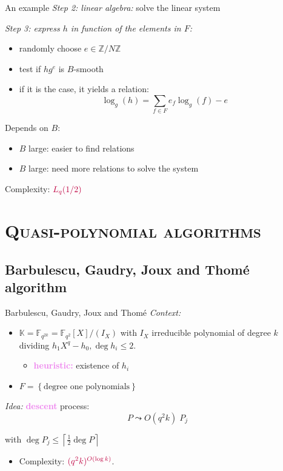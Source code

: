 \documentclass[xcolor=x11names,compress]{beamer}
\theoremstyle{break}
\theoremstyle{sc}
\theoremstyle{definition}
\theoremstyle{remark}
\begin{document}
\begin{frame}{An example}
  \emph{Step 2: linear algebra:} solve the linear system
  
  \emph{Step 3: express $h$ in function of the elements in $F$:}
  \begin{itemize}
     \item randomly choose $e\in \mathbb{Z}/N\mathbb{Z}$
    \item test if $hg^e$ is $B$-smooth
    \item if it is the case, it yields a relation:
     \[
      \log_g(h) = \sum_{f\in F}e_f\log_g(f) - e
      \]
  \end{itemize}

 Depends on $B$:
  \begin{itemize}
    \item $B$ large: easier to find relations
    \item $B$ large: need more relations to solve the system
  \end{itemize}
  Complexity: $\textcolor{purple}{L_q(1/2)}$

\end{frame}

\section{\scshape Quasi-polynomial algorithms} 
\subsection{Barbulescu, Gaudry, Joux and Thomé algorithm}

\begin{frame}{Barbulescu, Gaudry, Joux and Thomé}
  \emph{Context:}
  \begin{itemize}
    \item $\mathbb{K}=\mathbb{F}_{q^{2k}}=\mathbb{F}_{q^2}[X]/(I_X)$ with $I_X$ irreducible
      polynomial of degree $k$ dividing $h_1X^q-h_0, \deg h_i\leq 2$.
      \begin{itemize}
        \item \textcolor{violet}{\textbf{heuristic:}} existence of $h_i$
      \end{itemize}
    \item $F=\left\{  \text{degree one polynomials}\right\}$ 
\end{itemize}
\emph{Idea:} \textcolor{violet}{\textbf{descent}} process:
  \[
    P \leadsto O(q^2k)\; P_j   
  \]
    
    with $\deg P_j \leq \left\lceil\frac{1}{2}\deg P\right\rceil$

    \begin{itemize}
      \item Complexity: $\textcolor{purple}{(q^2k)^{O(\log k)}}$.
    \end{itemize}

\end{frame}
\end{document}
